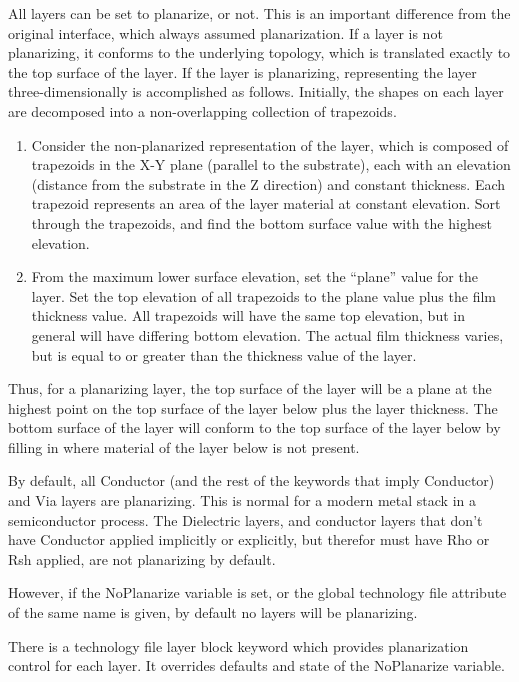 All layers can be set to planarize, or not.  This is an important
difference from the original interface, which always assumed
planarization.  If a layer is not planarizing, it conforms to the
underlying topology, which is translated exactly to the top surface of
the layer.  If the layer is planarizing, representing the layer
three-dimensionally is accomplished as follows.  Initially, the shapes
on each layer are decomposed into a non-overlapping collection of
trapezoids.

\begin{enumerate}
\item{Consider the non-planarized representation of the layer, which
is composed of trapezoids in the X-Y plane (parallel to the
substrate), each with an elevation (distance from the substrate in the
Z direction) and constant thickness.  Each trapezoid represents an
area of the layer material at constant elevation.  Sort through the
trapezoids, and find the bottom surface value with the highest
elevation.}

\item{From the maximum lower surface elevation, set the ``plane''
value for the layer.  Set the top elevation of all trapezoids to the
plane value plus the film thickness value.  All trapezoids will have
the same top elevation, but in general will have differing bottom
elevation.  The actual film thickness varies, but is equal to or
greater than the thickness value of the layer.}
\end{enumerate}

Thus, for a planarizing layer, the top surface of the layer will be a
plane at the highest point on the top surface of the layer below plus
the layer thickness.  The bottom surface of the layer will conform to
the top surface of the layer below by filling in where material of the
layer below is not present.

By default, all {\et Conductor} (and the rest of the keywords that
imply {\et Conductor}) and {\et Via} layers are planarizing.  This is
normal for a modern metal stack in a semiconductor process.  The {\et
Dielectric} layers, and conductor layers that don't have {\et
Conductor} applied implicitly or explicitly, but therefor must have
{\et Rho} or {\et Rsh} applied, are not planarizing by default.

However, if the {\et NoPlanarize} variable is set, or the global
technology file attribute of the same name is given, by default no
layers will be planarizing.

There is a technology file layer block keyword which provides
planarization control for each layer.  It overrides defaults and state
of the {\et NoPlanarize} variable.

